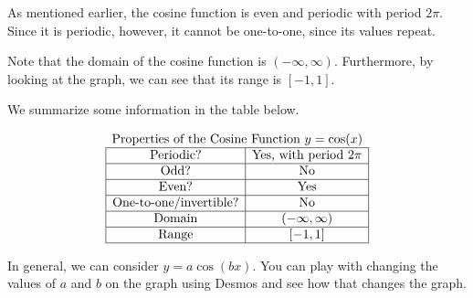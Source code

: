 \documentclass[nooutcomes]{ximera}
\begin{document}
As mentioned earlier, the cosine function is even and periodic with period $2\pi$. Since it is periodic, however, it cannot be one-to-one, since its values repeat. 


Note that the domain of the cosine function is $(-\infty, \infty)$. Furthermore, by looking at the graph, we can see that its range is $[-1, 1]$.

We summarize some information in the table below.

\[
\begin{array}{ c }
 \text{\normalfont Properties of the Cosine Function } y=\cos(x) \\
\begin{array}{|c|c|}
 \hline
\text{Periodic?} & \text{Yes, with period }2\pi \\ \hline
\text{Odd?} & \text{No} \\ \hline
\text{Even?} & \text{Yes} \\ \hline
\text{One-to-one/invertible?} & \text{No} \\ \hline
\text{Domain} & (-\infty,\infty)\\ \hline
\text{Range} & [-1,1]\\ \hline
\end{array}
\end{array}
\]

In general, we can consider $y=a\cos(bx)$.  You can play with changing the values of $a$ and $b$ on the graph using Desmos and see how that changes the graph.  

\begin{center}  
\end{center}

\end{document}
